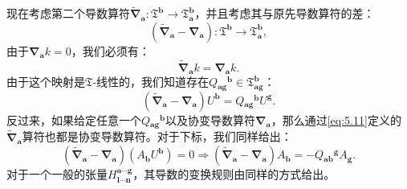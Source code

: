 现在考虑第二个导数算符$\tilde{\boldsymbol{\nabla }}_{\boldsymbol{a}} :\mathfrak{T}^{\boldsymbol{b}}\rightarrow \mathfrak{T}_{\boldsymbol{a}}^{\boldsymbol{b}}$，并且考虑其与原先导数算符的差：
\begin{equation*}
	(\tilde{\boldsymbol{\nabla }}_{\boldsymbol{a}} -\boldsymbol{\nabla }_{\boldsymbol{a}} ):\mathfrak{T}^{\boldsymbol{b}}\rightarrow \mathfrak{T}_{\boldsymbol{a}}^{\boldsymbol{b}} ,
\end{equation*}
由于$\boldsymbol{\nabla }_{\boldsymbol{a}} k=0$，我们必须有：
\begin{equation*}
	\tilde{\boldsymbol{\nabla }}_{\boldsymbol{a}} k=\boldsymbol{\nabla }_{\boldsymbol{a}} k.
\end{equation*}
由于这个映射是$\mathfrak{T}$-线性的，我们知道存在$Q{_{\boldsymbol{ag}}}^{\boldsymbol{b}} \in \mathfrak{T}_{\boldsymbol{ag}}^{\boldsymbol{b}}$：
\begin{equation}
	(\tilde{\boldsymbol{\nabla }}_{\boldsymbol{a}} -\boldsymbol{\nabla }_{\boldsymbol{a}} )U^{\boldsymbol{b}} =Q{_{\boldsymbol{ag}}}^{\boldsymbol{b}} U^{\boldsymbol{g}} .
	\label{eq:5.11}
\end{equation}
反过来，如果给定任意一个$Q{_{\boldsymbol{ag}}}^{\boldsymbol{b}}$以及协变导数算符$\boldsymbol{\nabla }_{\boldsymbol{a}}$，那么通过\ref{eq:5.11}定义的$\tilde{\boldsymbol{\nabla }}_{\boldsymbol{a}}$算符也都是协变导数算符。对于下标，我们同样给出：
\begin{equation*}
	(\tilde{\boldsymbol{\nabla }}_{\boldsymbol{a}} -\boldsymbol{\nabla }_{\boldsymbol{a}} )(A_{\boldsymbol{b}} U^{\boldsymbol{b}} )=0\Rightarrow (\tilde{\boldsymbol{\nabla }}_{\boldsymbol{a}} -\boldsymbol{\nabla }_{\boldsymbol{a}} )A_{\boldsymbol{b}} =-Q{_{\boldsymbol{ab}}}^{\boldsymbol{g}} A_{\boldsymbol{g}} .
\end{equation*}
对于一个一般的张量$H_{\boldsymbol{l} \cdots \boldsymbol{n}}^{\boldsymbol{a} \cdots \boldsymbol{g}}$，其导数的变换规则由同样的方式给出。



